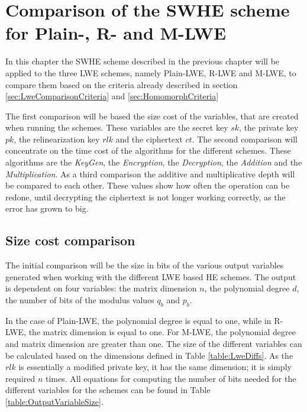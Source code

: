 \chapter{Comparison of the SWHE scheme for Plain-, R- and M-LWE}

In this chapter the SWHE scheme described in the previous chapter will be applied to the three LWE schemes, namely Plain-LWE, R-LWE and M-LWE, to compare them based on the criteria already described in section \ref{sec:LweComparisonCriteria} and \ref{sec:HomomorphCriteria}

The first comparison will be based the size cost of the variables, that are created when running the schemes. These variables are the secret key $sk$, the private key $pk$, the relinearization key $rlk$ and the ciphertext $ct$. The second comparison will concentrate on the time cost of the algorithms for the different schemes. These algorithms are the \textit{KeyGen}, the \textit{Encryption}, the \textit{Decryption}, the \textit{Addition} and the \textit{Multiplication}. As a third comparison the additive and multiplicative depth will be compared to each other. These values show how often the operation can be redone, until decrypting the ciphertext is not longer working correctly, as the error has grown to big.

\section{Size cost comparison}
\label{sec:sizeCostComparison}

The initial comparison will be the size in bits of the various output variables generated when working with the different LWE based HE schemes. The output is dependent on four variables: the matrix dimension $n$, the polynomial degree $d$, the number of bits of the modulus values $q_b$ and $p_b$.

In the case of Plain-LWE, the polynomial degree is equal to one, while in R-LWE, the matrix dimension is equal to one. For M-LWE, the polynomial degree and matrix dimension are greater than one. The size of the different variables can be calculated based on the dimensions defined in Table \ref{table:LweDiffs}. As the $rlk$ is essentially a modified private key, it has the same dimension; it is simply required $n$ times. All equations for computing the number of bits needed for the different variables for the schemes can be found in Table \ref{table:OutputVariableSize}. 

